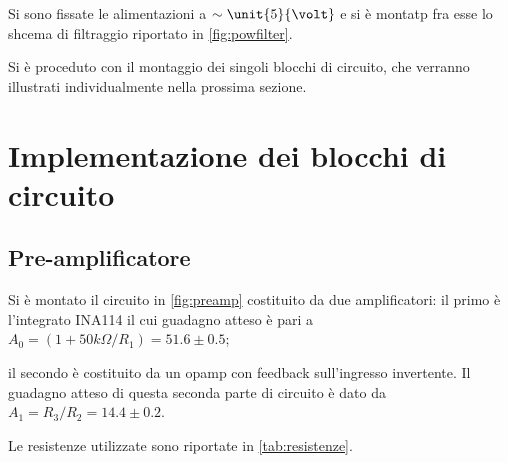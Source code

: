 \documentclass[a4paper,10pt]{article}
\begin{document}
Si sono fissate le alimentazioni a $\sim \unit{5}{\volt}$ e si è montatp fra esse lo shcema di filtraggio riportato in  \cref{fig:powfilter}.

Si è proceduto con il montaggio dei singoli blocchi di circuito, che verranno illustrati individualmente nella prossima sezione.

\vspace*{-10pt}

\section{Implementazione dei blocchi di circuito}

\subsection{Pre-amplificatore}

Si è montato il circuito in \cref{fig:preamp} costituito da due amplificatori: il primo è l'integrato INA114 il cui guadagno atteso è pari a $A_0 = (1+ 50k\Omega/R_1) = 51.6 \pm 0.5$; %



il secondo è costituito da un opamp con feedback sull'ingresso invertente. Il guadagno atteso di questa seconda parte di circuito è dato da $A_1 = R_3/R_2 = 14.4 \pm 0.2 $.

Le resistenze utilizzate sono riportate in \cref{tab:resistenze}.

\vspace*{-10pt}
\end{document}
